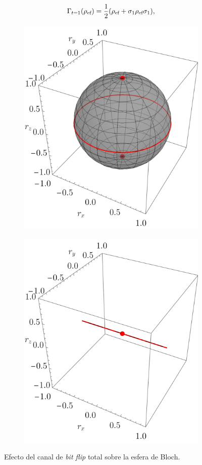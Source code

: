 \begin{equation}
  \Gamma_{t=1}(\rho_{\text{ef}})=\frac{1}{2}\qty(\rho_{\text{ef}}+\sigma_{1}\rho_{\text{ef}}\sigma_{1}),\nonumber
\end{equation}
\begin{figure}[ht!]
  \centering
  \begin{subfigure}{0.5\textwidth}
    \centering
    \includegraphics[width=0.6\linewidth]{chapter3/figures_toy/CNOT_p=0.5_t=0._r=0.9.png}
  \end{subfigure}%
  \begin{subfigure}{0.5\textwidth}
    \centering
    \includegraphics[width=0.6\linewidth]{chapter3/figures_toy/CNOT_p=0._t=1_r=0.9.png}
  \end{subfigure}
  \caption{Efecto del canal de \textit{bit flip} total sobre la esfera de Bloch. \label{fig:BitFlip}}
\end{figure}
